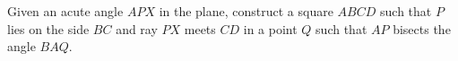 Given an acute angle $APX$ in the plane, construct a square $ABCD$ such that $P$ lies on the side $BC$ and ray $PX$ meets $CD$ in a point $Q$ such that $AP$ bisects the angle $BAQ$.